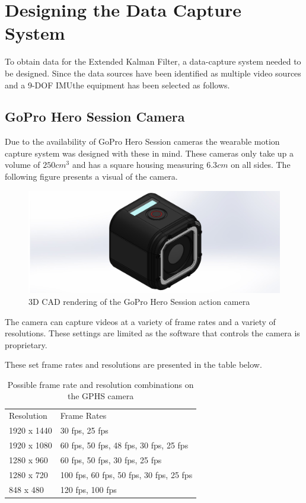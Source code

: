 \chapter{Designing the Data Capture System}
To obtain data for the Extended Kalman Filter, a data-capture system needed to be designed. Since the data sources have been identified as multiple video sources and a 9-DOF IMUthe equipment has been selected as follows. 

\section{GoPro Hero Session Camera}
Due to the availability of GoPro Hero Session cameras the wearable motion capture system was designed with these in mind. These cameras only take up a volume of $250cm^3$ and has a square housing measuring $6.3cm$ on all sides. The following figure presents a visual of the camera.

\begin{figure}[!ht] 
\captionsetup{width=\linewidth, font=small}  
\includegraphics[width=\linewidth]{figures/GoProHero4Session.JPG}
\caption{3D CAD rendering of the GoPro Hero Session action camera}
\label{fig:GoProHero4Session}
\end{figure}

The camera can capture videos at a variety of frame rates and a variety of resolutions. These settings are limited as the software that controls the camera is proprietary.

These set frame rates and resolutions are presented in the table below.
\begin{table}[!ht]
\centering
\caption{Possible frame rate and resolution combinations on the GPHS camera}
\label{framesres}
\begin{tabular}{ll}
Resolution  & Frame Rates                             \\
1920 x 1440 & 30 fps, 25 fps                          \\
1920 x 1080 & 60 fps, 50 fps, 48 fps, 30 fps, 25 fps  \\
1280 x 960  & 60 fps, 50 fps, 30 fps, 25 fps          \\
1280 x 720  & 100 fps, 60 fps, 50 fps, 30 fps, 25 fps \\
848 x 480   & 120 fps, 100 fps                       
\end{tabular}
\end{table}

